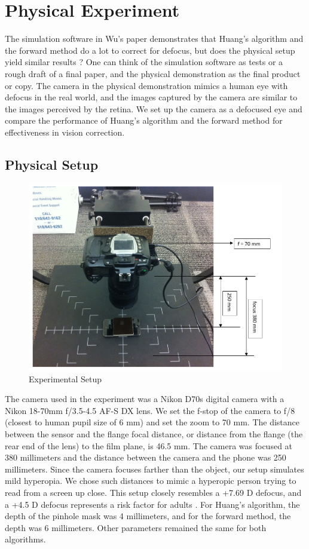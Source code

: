 \chapter{Physical Experiment}

The simulation software in Wu's paper demonstrates that Huang's algorithm and the forward method do a lot to correct for defocus, but does the physical setup yield similar results \cite{Wu:EECS-2016-67}? One can think of the simulation software as tests or a rough draft of a final paper, and the physical demonstration as the final product or copy. The camera in the physical demonstration mimics a human eye with defocus in the real world, and the images captured by the camera are similar to the images perceived by the retina. We set up the camera as a defocused eye and compare the performance of Huang's algorithm and the forward method for effectiveness in vision correction.

\section{Physical Setup}

\begin{figure}[ht]
  \centering
  \includegraphics[width=5in]{chapters/chapter5/images/Setup.png}
  \caption{Experimental Setup}
  \label{fig:physical_setup}
\end{figure}
 
The camera used in the experiment was a Nikon D70s digital camera with a Nikon 18-70mm f/3.5-4.5 AF-S DX lens. We set the f-stop of the camera to f/8 (closest to human pupil size of 6 mm) and set the zoom to 70 mm. The distance between the sensor and the flange focal distance, or distance from the flange (the rear end of the lens) to the film plane, is 46.5 mm. The camera was focused at 380 millimeters and the distance between the camera and the phone was 250 millimeters. Since the camera focuses farther than the object, our setup simulates mild hyperopia. We chose such distances to mimic a hyperopic person trying to read from a screen up close. This setup closely resembles a +7.69 D defocus, and a +4.5 D defocus represents a risk factor for adults \cite{iscreenvision.com}. For Huang’s algorithm, the depth of the pinhole mask was 4 millimeters, and for the forward method, the depth was 6 millimeters. Other parameters remained the same for both algorithms. 

